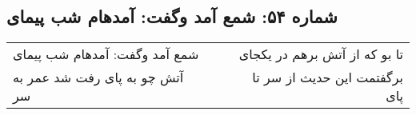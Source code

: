 \begin{center}
\section*{شماره ۵۴: شمع آمد وگفت: آمدهام شب پیمای}
\label{sec:054}
\begin{longtable}{l p{0.5cm} r}
شمع آمد وگفت: آمدهام شب پیمای
&&
تا بو که از آتش برهم در یکجای
\\
آتش چو به پای رفت شد عمر به سر
&&
برگفتمت این حدیث از سر تا پای
\\
\end{longtable}
\end{center}

